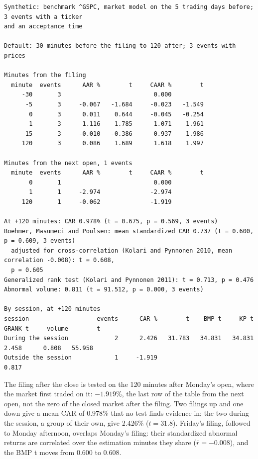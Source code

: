 \begingroup\footnotesize
\begin{verbatim}
Synthetic: benchmark ^GSPC, market model on the 5 trading days before; 3 events with a ticker
and an acceptance time

Default: 30 minutes before the filing to 120 after; 3 events with prices

Minutes from the filing
  minute  events      AAR %        t     CAAR %        t
     -30       3                          0.000
      -5       3     -0.067   -1.684     -0.023   -1.549
       0       3      0.011    0.644     -0.045   -0.254
       1       3      1.116    1.785      1.071    1.961
      15       3     -0.010   -0.386      0.937    1.986
     120       3      0.086    1.689      1.618    1.997

Minutes from the next open, 1 events
  minute  events      AAR %        t     CAAR %        t
       0       1                          0.000
       1       1     -2.974              -2.974
     120       1     -0.062              -1.919

At +120 minutes: CAR 0.978% (t = 0.675, p = 0.569, 3 events)
Boehmer, Masumeci and Poulsen: mean standardized CAR 0.737 (t = 0.600, p = 0.609, 3 events)
  adjusted for cross-correlation (Kolari and Pynnonen 2010, mean correlation -0.008): t = 0.608,
  p = 0.605
Generalized rank test (Kolari and Pynnonen 2011): t = 0.713, p = 0.476
Abnormal volume: 0.811 (t = 91.512, p = 0.000, 3 events)

By session, at +120 minutes
session                   events      CAR %        t    BMP t     KP t  GRANK t     volume        t
During the session             2      2.426   31.783   34.831   34.831    2.458      0.808   55.958
Outside the session            1     -1.919                                          0.817
\end{verbatim}
\endgroup

The filing after the close is tested on the 120 minutes after Monday's open, where the market first traded on it:
$-1.919$\%, the last row of the table from the next open, not the zero of the closed market after the filing. Two
filings up and one down give a mean CAR of 0.978\% that no test finds evidence in; the two during the session, a group
of their own, give 2.426\% ($t = 31.8$). Friday's filing, followed to Monday afternoon, overlaps Monday's filing: their
standardized abnormal returns are correlated over the estimation minutes they share ($\bar r = -0.008$), and the BMP t
moves from 0.600 to 0.608.

